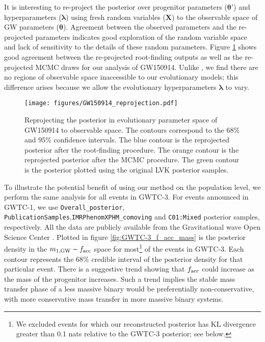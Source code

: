 \documentclass[linenumbers,twocolumn]{aastex631}
\begin{document}
It is interesting to re-project the posterior over progenitor parameters
($\bm{\theta}'$) and hyperparameters ($\bm{\lambda}$) using fresh random
variables ($\bm{X}$) to the observable space of GW parameters ($\bm{\theta}$).
Agreement between the observed parameters and the re-projected parameters
indicates good exploration of the random variable space and lack of sensitivity
to the details of these random parameters.  Figure
\ref{fig:GW150914_reprojection} shows good agreement between the re-projected
root-finding outputs as well as the re-projected MCMC draws for our analysis of
GW150914.  Unlike \citet{Andrews2021}, we find there are no regions of
observable space inaccessible to our evolutionary models; this difference arises
because we allow the evolutionary hyperparameters $\bm{\lambda}$ to vary.

\begin{figure}
\texttt{[image: figures/GW150914\_reprojection.pdf]}
\caption{Reprojecting the posterior in evolutionary parameter space of GW150914
to observable space. The contours correspond to the $68\%$ and $95\%$ confidence
intervals. The blue contour is the reprojected posterior after the root-finding
procedure. The orange contour is the reprojected posterior after the MCMC
procedure. The green contour is the posterior plotted using the original LVK
posterior samples. }
\label{fig:GW150914_reprojection}
\end{figure}


To illustrate the potential benefit of using our method on the population level,
we perform the same analysis for all events in GWTC-3. For events announced in
GWTC-1, we use \texttt{Overall\_posterior},
\texttt{PublicationSamples},\texttt{IMRPhenomXPHM\_comoving} and
\texttt{C01:Mixed} posterior samples, respectively. All the data are publicly
available from the Gravitational wave Open Science Center
\citep{LIGOScientific:2019lzm}. Plotted in figure \ref{fig:GWTC-3_f_acc_mass} is
the posterior density in the $m_{1,{\rm GW}}-f_{\rm acc}$ space for
most\footnote{We excluded events for which our reconstructed posterior has KL
divergence greater than 0.1 nats relative to the GWTC-3 posterior; see below.}
of the events in GWTC-3. Each contour represents the $68\%$ credible interval of
the posterior density for that particular event. There is a suggestive trend
showing that $f_{\rm acc}$ could increase as the mass of the progenitor
increases. Such a trend implies the stable mass transfer phase of a less massive
binary would be preferentially non-conservative, with more conservative mass
transfer in more massive binary systems.
\end{document}
